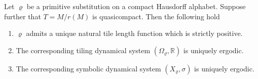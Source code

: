 \begin{thm}\label{thm:unique-ergod}
Let $\varrho$ be a primitive substitution on a compact Hausdorff alphabet. Suppose further that $T=M/r(M)$ is quasicompact. Then the following hold
\begin{enumerate}[label={{\rm (\roman*)}}]
\item $\varrho$ admits a unique natural tile length function which is strictly positive.
\item The corresponding tiling dynamical system $(\Omega_{\varrho},\mathbb{R})$ is uniquely ergodic.
\item The corresponding symbolic dynamical system $(X_{\varrho},\sigma)$ is  uniquely ergodic. 
\end{enumerate}
\end{thm}
